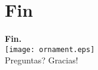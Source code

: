 \documentclass[9pt, handout]{beamer}
\begin{document}
  \section*{Fin}
    \begin{frame}
      \begin{center}
      	\textbf{\calligra\Huge Fin.}\\
        \texttt{[image: ornament.eps]}\\[1cm]
      	\pause
      	{\huge\calligra Preguntas?\pause{} Gracias!}
      \end{center}
    \end{frame}
      
\end{document}
